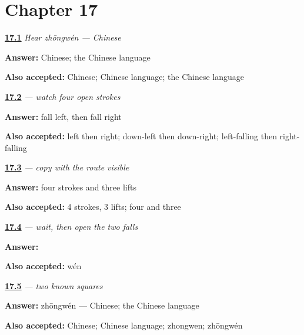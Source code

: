\section*{Chapter 17}

\noindent\begin{minipage}[t]{\linewidth}
\raggedright
\hyperlink{review-ZH-C17-hear-zhongwen-meaning}{\textbf{17.1}} \emph{Hear \emph{zhōngwén} — Chinese}\par
\small \textbf{Answer:} Chinese; the Chinese language\par
\footnotesize \textbf{Also accepted:} Chinese; Chinese language; the Chinese language
\end{minipage}\par\medskip

\noindent\begin{minipage}[t]{\linewidth}
\raggedright
\hyperlink{review-ZH-W17-wen-observe-order}{\textbf{17.2}} \emph{ — watch four open strokes}\par
\small \textbf{Answer:} fall left, then fall right\par
\footnotesize \textbf{Also accepted:} left then right; down-left then down-right; left-falling then right-falling
\end{minipage}\par\medskip

\noindent\begin{minipage}[t]{\linewidth}
\raggedright
\hyperlink{review-ZH-W17-wen-guided-count}{\textbf{17.3}} \emph{ — copy with the route visible}\par
\small \textbf{Answer:} four strokes and three lifts\par
\footnotesize \textbf{Also accepted:} 4 strokes, 3 lifts; four and three
\end{minipage}\par\medskip

\noindent\begin{minipage}[t]{\linewidth}
\raggedright
\hyperlink{review-ZH-W17-wen-delayed-write}{\textbf{17.4}} \emph{ — wait, then open the two falls}\par
\small \textbf{Answer:} \par
\footnotesize \textbf{Also accepted:}  wén
\end{minipage}\par\medskip

\noindent\begin{minipage}[t]{\linewidth}
\raggedright
\hyperlink{review-ZH-C17-zhongwen-read}{\textbf{17.5}} \emph{ — two known squares}\par
\small \textbf{Answer:} zhōngwén — Chinese; the Chinese language\par
\footnotesize \textbf{Also accepted:} Chinese; Chinese language; zhongwen; zhōngwén
\end{minipage}\par\medskip

